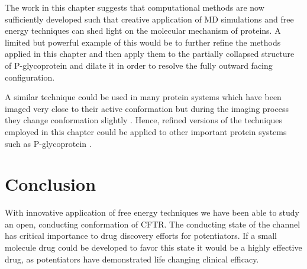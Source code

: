 


The work in this chapter suggests that computational methods are now sufficiently developed such that creative application of MD simulations and free energy techniques can shed light on the molecular mechanism of proteins. A limited but powerful example of this would be to further refine the methods applied in this chapter and then apply them to the partially collapsed structure of P-glycoprotein and dilate it in order to resolve the fully outward facing configuration.

A similar technique could be used in many protein systems which have been imaged very close to their active conformation but during the imaging process they change conformation slightly \cite{bock2022}. Hence, refined versions of the techniques employed in this chapter could be applied to other important protein systems such as P-glycoprotein \cite{kim2018a}.  %


\section{Conclusion}
With innovative application of free energy techniques we have been able to study an open, conducting conformation of CFTR. The conducting state of the channel has critical importance to drug discovery efforts for potentiators. If a small molecule drug could be developed to favor this state it would be a highly effective drug, as potentiators have demonstrated life changing clinical efficacy.

